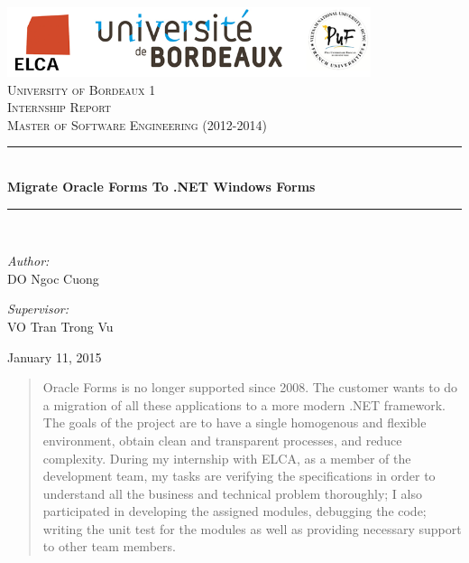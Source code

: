 \documentclass[a4paper,12pt]{report}
\begin{document}
\begin{titlepage}
	\begin{center}
	\newcommand{\HRule}{\rule{\linewidth}{0.5mm}}
		
		\includegraphics[width=0.8\textwidth]{logo2.PNG}~\\[0.2cm]
		\textsc{\large University of Bordeaux 1}\\[1.5cm]
		
		\textsc{\large Internship Report}\\[0.5cm]
		\textsc{\large Master of Software Engineering (2012-2014)}\\[0.5cm]
	
		\HRule \\[0.4cm]
		{ \huge \bfseries Migrate Oracle Forms To .NET Windows Forms \\[0.4cm] }
		\HRule \\[1.5cm]
		
		\noindent
		\begin{minipage}{0.4\textwidth}
			\begin{flushleft} \large
				\emph{Author:}\\
				\textsc{DO} Ngoc Cuong
			\end{flushleft}
		\end{minipage}%
		\begin{minipage}{0.4\textwidth}
			\begin{flushright} \large
				\emph{Supervisor:} \\
				\textsc{VO} Tran Trong Vu
			\end{flushright}
		\end{minipage}
		
		\vfill
		
		{\large January 11, 2015}
		
	\end{center}
\end{titlepage}
\begin{abstract}
Oracle Forms is no longer supported since 2008. The customer wants to do a migration of all these applications to a more modern .NET framework. The goals of the project are to have a single homogenous and flexible environment, obtain clean and transparent processes, and reduce complexity. During my internship with ELCA, as a member of the development team, my tasks are verifying the specifications in order to understand all the business and technical problem thoroughly; I also participated in developing the assigned modules, debugging the code; writing the unit test for the modules as well as providing necessary support to other team members. 
\end{abstract}
\tableofcontents
\listoffigures
\newpage
\end{document}
